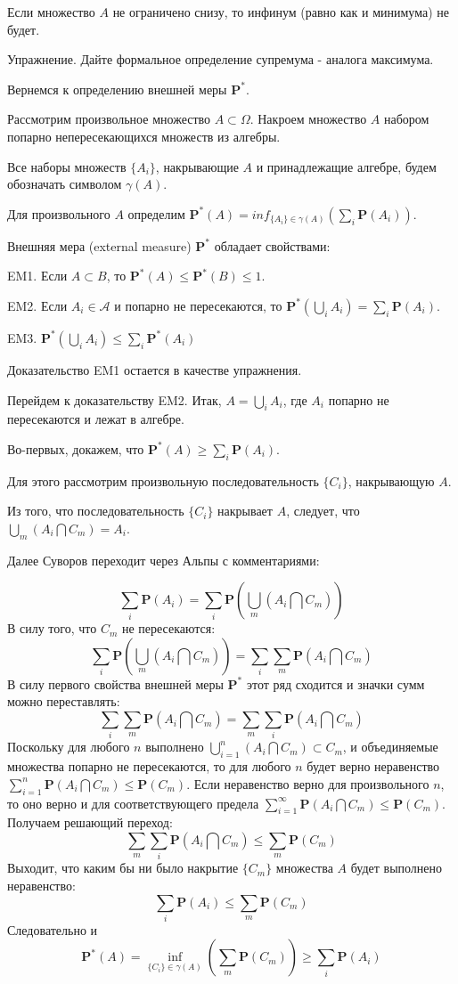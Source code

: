 {Если множество $A$ не ограничено снизу, то инфинум (равно как и
минимума) не будет.

Упражнение. Дайте формальное определение супремума - аналога
максимума.

Вернемся к определению внешней меры $\mathbf{P^{*}}$.

Рассмотрим произвольное множество $A \subset \Omega$. Накроем
множество $A$ набором попарно непересекающихся множеств из
алгебры.

Все наборы множеств $\{A_{i}\}$, накрывающие $A$ и принадлежащие
алгебре, будем обозначать символом $\gamma(A)$.

Для произвольного $A$ определим
$\mathbf{P^{*}}(A)=inf_{\{A_{i}\}\in
\gamma(A)}(\sum_{i}\mathbf{P}(A_{i}))$.

Внешняя мера (external measure) $\mathbf{P^{*}}$ обладает
свойствами:

EM1. Если $A\subset B$, то $\mathbf{P^{*}}(A)\leq
\mathbf{P^{*}}(B)\leq 1$.

EM2. Если $A_{i}\in \mathcal{A}$ и попарно не пересекаются, то
$\mathbf{P^{*}}(\bigcup_{i}A_{i})=\sum_{i}\mathbf{P}(A_{i})$.

EM3.
$\mathbf{P^{*}}(\bigcup_{i}A_{i})\leq\sum_{i}\mathbf{P^{*}}(A_{i})$


Доказательство EM1 остается в качестве упражнения.

Перейдем к доказательству EM2. Итак, $A=\bigcup_{i}A_{i}$, где
$A_{i}$ попарно не пересекаются и лежат в алгебре.

Во-первых, докажем, что
$\mathbf{P^{*}}(A)\geq\sum_{i}\mathbf{P}(A_{i})$.

Для этого рассмотрим произвольную последовательность $\{C_{i}\}$,
накрывающую $A$.

Из того, что последовательность $\{C_{i}\}$ накрывает $A$,
следует, что $\bigcup_{m}(A_{i}\bigcap C_{m})=A_{i}$.

Далее Суворов переходит через Альпы с комментариями:

$$
\sum_{i}\mathbf{P}(A_{i})=
\sum_{i}\mathbf{P}(\bigcup_{m}(A_{i}\bigcap C_{m}))
$$
В силу того, что $C_{m}$ не пересекаются:
$$
\sum_{i}\mathbf{P}(\bigcup_{m}(A_{i}\bigcap C_{m}))
=\sum_{i}\sum_{m}\mathbf{P}( A_{i}\bigcap C_{m} )
$$
В силу первого свойства внешней меры $\mathbf{P^{*}}$ этот ряд
сходится и значки сумм можно переставлять:
$$
\sum_{i}\sum_{m}\mathbf{P}( A_{i}\bigcap C_{m} )
=\sum_{m}\sum_{i}\mathbf{P}( A_{i}\bigcap C_{m} )
$$
Поскольку для любого $n$ выполнено $\bigcup_{i=1}^{n} (
A_{i}\bigcap C_{m} ) \subset C_{m}$, и объединяемые множества
попарно не пересекаются, то для любого $n$ будет верно неравенство
$\sum_{i=1}^{n}\mathbf{P} ( A_{i}\bigcap C_{m} ) \leq \mathbf{P}
(C_{m} )$. Если неравенство верно для произвольного $n$, то оно
верно и для соответствующего предела
$\sum_{i=1}^{\infty}\mathbf{P} ( A_{i}\bigcap C_{m} ) \leq
\mathbf{P} (C_{m} )$. Получаем решающий переход:
$$
\sum_{m}\sum_{i}\mathbf{P}( A_{i}\bigcap C_{m} )
 \leq \sum_{m} \mathbf{P} (C_{m} )
$$
Выходит, что каким бы ни было накрытие $\{C_{m}\}$ множества $A$
будет выполнено неравенство:
$$
\sum_{i}\mathbf{P}(A_{i})\leq \sum_{m} \mathbf{P} (C_{m} )
$$
Следовательно и
$$
\mathbf{P^{*}}(A)=\inf_{\{C_{i}\} \in \gamma(A)}(\sum_{m}
\mathbf{P} (C_{m} ))\geq \sum_{i}\mathbf{P}(A_{i})
$$

}
